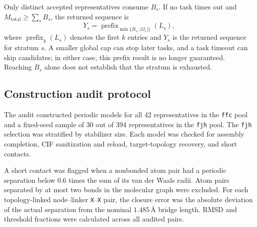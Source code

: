 \documentclass[a5paper, 10pt]{article}
\begin{document}
Only distinct accepted representatives consume $B_s$. If no task times out and $M_{\mathrm{total}}\geq\sum_s B_s$, the returned sequence is
\begin{equation}
Y_s=\operatorname{prefix}_{\min\{B_s,|\Omega_s|\}}(L_s),
\label{eq:quota_prefix}
\end{equation}
where $\operatorname{prefix}_k(L_s)$ denotes the first $k$ entries and $Y_s$ is the returned sequence for stratum $s$. A smaller global cap can stop later tasks, and a task timeout can skip candidates; in either case, this prefix result is no longer guaranteed. Reaching $B_s$ alone does not establish that the stratum is exhausted.

\subsection{Construction audit protocol}
\label{app:reconstruction_audit}

The audit constructed periodic models for all 42 representatives in the \texttt{ffc} pool and a fixed-seed sample of 30 out of 394 representatives in the \texttt{fjh} pool. The \texttt{fjh} selection was stratified by stabilizer size. Each model was checked for assembly completion, CIF sanitization and reload, target-topology recovery, and short contacts.

A short contact was flagged when a nonbonded atom pair had a periodic separation below $0.6$ times the sum of its van der Waals radii. Atom pairs separated by at most two bonds in the molecular graph were excluded. For each topology-linked node--linker \texttt{X}--\texttt{X} pair, the closure error was the absolute deviation of the actual separation from the nominal $1.485$\,\AA{} bridge length. RMSD and threshold fractions were calculated across all audited pairs.
\end{document}
